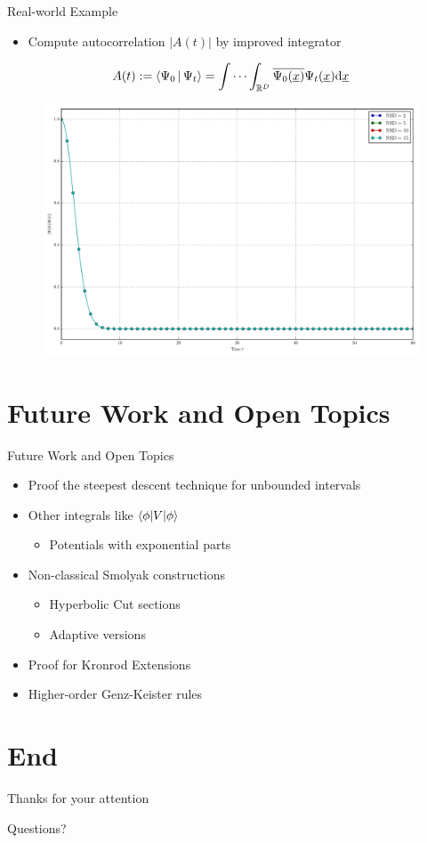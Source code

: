 \documentclass{beamer}
\begin{document}
\begin{frame}{Real-world Example }
  \begin{itemize}
    \item Compute autocorrelation $|A(t)|$ by improved integrator
  \end{itemize}
  \vspace{0.2cm}
  \begin{equation*}
    A(t) := \Braket{\Psi_0 | \Psi_t}
         = \idotsint_{\mathbb{R}^D} \overline{\Psi_0(\underline{x})} \Psi_t(\underline{x}) \mathrm{d}\underline{x}
  \end{equation*}
  \begin{figure}
    \centering
    \includegraphics[width=0.7\linewidth]{./fig/ac_mercurial_morse_nsd.pdf}
  \end{figure}
\end{frame}


\section{Future Work and Open Topics}


\begin{frame}{Future Work and Open Topics}
  \begin{itemize}
    \item Proof the steepest descent technique for unbounded intervals
    \item Other integrals like $\braket{\phi|V|\phi}$
    \begin{itemize}
      \item Potentials with exponential parts
    \end{itemize}
    \item Non-classical Smolyak constructions
    \begin{itemize}
      \item Hyperbolic Cut sections
      \item Adaptive versions
    \end{itemize}
    \item Proof for Kronrod Extensions
    \item Higher-order Genz-Keister rules
  \end{itemize}
\end{frame}


\section{End}


\begin{frame}{Thanks for your attention}
  \begin{center}
    {\Huge{Questions?}}
  \end{center}
\end{frame}
\end{document}

